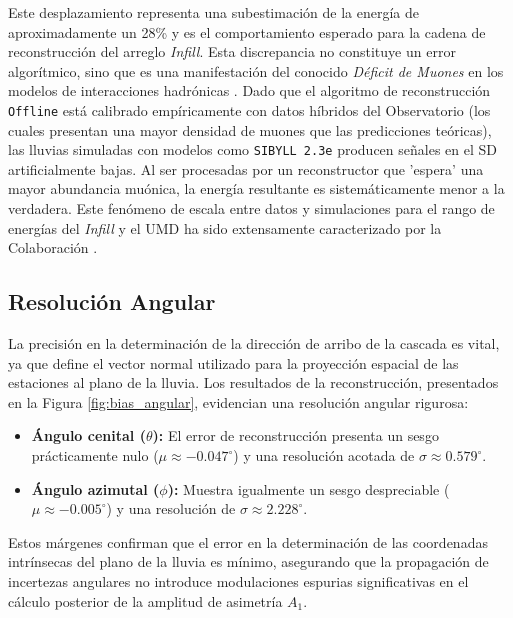 Este desplazamiento representa una subestimación de la energía de aproximadamente un 28\% y es el comportamiento esperado para la cadena de reconstrucción del arreglo \textit{Infill}. Esta discrepancia no constituye un error algorítmico, sino que es una manifestación del conocido \textit{Déficit de Muones} en los modelos de interacciones hadrónicas \cite{auger2016muon_deficit}. Dado que el algoritmo de reconstrucción \texttt{Offline} está calibrado empíricamente con datos híbridos del Observatorio (los cuales presentan una mayor densidad de muones que las predicciones teóricas), las lluvias simuladas con modelos como \texttt{SIBYLL 2.3e} producen señales en el SD artificialmente bajas. Al ser procesadas por un reconstructor que 'espera' una mayor abundancia muónica, la energía resultante es sistemáticamente menor a la verdadera. Este fenómeno de escala entre datos y simulaciones para el rango de energías del \textit{Infill} y el UMD ha sido extensamente caracterizado por la Colaboración \cite{auger2020umd_infill}.

\subsection{Resolución Angular}

La precisión en la determinación de la dirección de arribo de la cascada es vital, ya que define el vector normal utilizado para la proyección espacial de las estaciones al plano de la lluvia. Los resultados de la reconstrucción, presentados en la Figura \ref{fig:bias_angular}, evidencian una resolución angular rigurosa:

\begin{itemize}
	\item \textbf{Ángulo cenital ($\theta$):} El error de reconstrucción presenta un sesgo prácticamente nulo ($\mu \approx -0.047^\circ$) y una resolución acotada de $\sigma \approx 0.579^\circ$.
	\item \textbf{Ángulo azimutal ($\phi$):} Muestra igualmente un sesgo despreciable ($\mu \approx -0.005^\circ$) y una resolución de $\sigma \approx 2.228^\circ$.
\end{itemize}

Estos márgenes confirman que el error en la determinación de las coordenadas intrínsecas del plano de la lluvia es mínimo, asegurando que la propagación de incertezas angulares no introduce modulaciones espurias significativas en el cálculo posterior de la amplitud de asimetría $A_1$.

